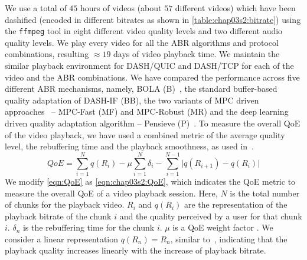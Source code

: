 We use a total of $45$ hours of videos (about $57$ different videos) which have been dashified (encoded in different bitrates as shown in \tbl\ref{table:chap03s2:bitrate}) using the {\tt ffmpeg} tool in eight different video quality levels and two different audio quality levels. We play every video for all the \ac{ABR} algorithms and protocol combinations, resulting $\approx 19$ days of video playback time. We maintain the similar playback environment for DASH/QUIC and DASH/TCP for each of the video and the \ac{ABR} combinations. 
We have compared the performance across five different \ac{ABR} mechanisms, namely, BOLA (B)~\cite{Spiteri2016}, the standard buffer-based quality adaptation of \ac{DASH-IF} (BB), the two variants of MPC driven approaches~\cite{yin2015control} -- MPC-Fast (MF) and MPC-Robust (MR) and the deep learning driven quality adaptation algorithm -- Pensieve (P)~\cite{mao2017neural}. To measure the overall \ac{QoE} of the video playback, we have used a combined metric of the average quality level, the rebuffering time and the playback smoothness, as used in~\cite{yin2015control,mao2017neural}.
\begin{equation}
QoE=\sum_{i=1}^{N}q(R_i)-\mu\sum_{i=1}^{N}\delta_i-\sum_{i=1}^{N-1} \bigg\vert q(R_{i+1})-q(R_i)  \bigg\vert
\label{eqn:chap03s2:QoE}
\end{equation}
We modify \eqn\ref{eqn:QoE} as \eqn\ref{eqn:chap03s2:QoE}, which indicates the \ac{QoE} metric to measure the overall \ac{QoE} of a video playback session. Here, $N$ is the total number of chunks for the playback video. $R_i$ and $q(R_i)$ are the representation of the playback bitrate of the chunk $i$ and the quality perceived by a user for that chunk $i$. $\delta_n$ is the rebuffering time for the chunk $i$. $\mu$ is a QoE weight factor \cite{yin2015control}.
We consider a linear representation $q(R_n) = R_n$, similar to~\cite{yin2015control}, indicating that the playback quality increases linearly with the increase of playback bitrate.
